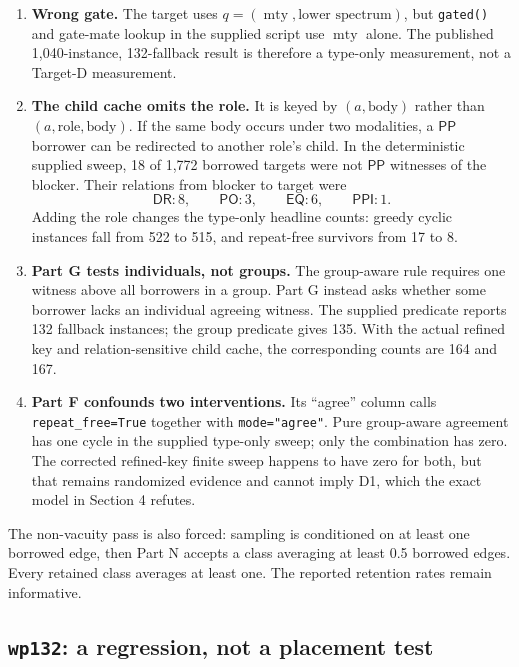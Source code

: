 \documentclass[11pt]{article}
\newcommand{\PP}{\mathsf{PP}}
\newcommand{\PPI}{\mathsf{PPI}}
\newcommand{\PO}{\mathsf{PO}}
\newcommand{\DR}{\mathsf{DR}}
\newcommand{\EQ}{\mathsf{EQ}}
\newcommand{\mty}{\operatorname{mty}}
\begin{document}
\begin{enumerate}
  \item \textbf{Wrong gate.} The target uses $q=(\mty,\text{lower spectrum})$, but
        \texttt{gated()} and gate-mate lookup in the supplied script use $\mty$ alone.
        The published 1,040-instance, 132-fallback result is therefore a type-only
        measurement, not a Target-D measurement.

  \item \textbf{The child cache omits the role.} It is keyed by $(a,\text{body})$ rather
        than $(a,\text{role},\text{body})$. If the same body occurs under two modalities,
        a $\PP$ borrower can be redirected to another role's child. In the deterministic
        supplied sweep, 18 of 1,772 borrowed targets were not $\PP$ witnesses of the
        blocker. Their relations from blocker to target were
        \[
          \DR:8,\qquad\PO:3,\qquad\EQ:6,\qquad\PPI:1.
        \]
        Adding the role changes the type-only headline counts: greedy cyclic instances
        fall from 522 to 515, and repeat-free survivors from 17 to 8.

  \item \textbf{Part G tests individuals, not groups.} The group-aware rule requires one
        witness above all borrowers in a group. Part G instead asks whether some borrower
        lacks an individual agreeing witness. The supplied predicate reports 132 fallback
        instances; the group predicate gives 135. With the actual refined key and
        relation-sensitive child cache, the corresponding counts are 164 and 167.

  \item \textbf{Part F confounds two interventions.} Its ``agree'' column calls
        \texttt{repeat\_free=True} together with \texttt{mode="agree"}. Pure group-aware
        agreement has one cycle in the supplied type-only sweep; only the combination has
        zero. The corrected refined-key finite sweep happens to have zero for both, but
        that remains randomized evidence and cannot imply D1, which the exact model in
        Section 4 refutes.
\end{enumerate}

The non-vacuity pass is also forced: sampling is conditioned on at least one borrowed
edge, then Part N accepts a class averaging at least 0.5 borrowed edges. Every retained
class averages at least one. The reported retention rates remain informative.

\subsection{\texttt{wp132}: a regression, not a placement test}
\end{document}

